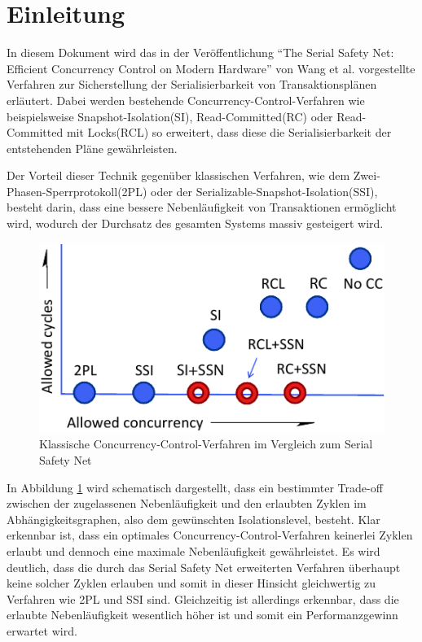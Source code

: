 \section{Einleitung}

In diesem Dokument wird das in der Veröffentlichung \enquote{The Serial Safety Net: Efficient Concurrency Control on Modern Hardware} von Wang et al. \cite{Wang:2015} vorgestellte Verfahren zur Sicherstellung der Serialisierbarkeit von Transaktionsplänen erläutert.
Dabei werden bestehende Concurrency-Control-Verfahren wie beispielsweise Snapshot-Isolation(SI), Read-Committed(RC) oder Read-Committed mit Locks(RCL) so erweitert, dass diese die Serialisierbarkeit der entstehenden Pläne gewährleisten.

Der Vorteil dieser Technik gegenüber klassischen Verfahren, wie dem Zwei-Phasen-Sperrprotokoll(2PL) oder der Serializable-Snapshot-Isolation(SSI), besteht darin, dass eine bessere Nebenläufigkeit von Transaktionen ermöglicht wird, wodurch der Durchsatz des gesamten Systems massiv gesteigert wird.

\begin{figure}
	\includegraphics{img/Figure_1_komplett.pdf}
	\caption{Klassische Concurrency-Control-Verfahren im Vergleich zum Serial Safety Net}
	\label{fig:trade_off}
\end{figure}

In Abbildung \ref{fig:trade_off} wird schematisch dargestellt, dass ein bestimmter Trade-off zwischen der zugelassenen Nebenläufigkeit und den erlaubten Zyklen im Abhängigkeitsgraphen, also dem gewünschten Isolationslevel, besteht.
Klar erkennbar ist, dass ein optimales Concurrency-Control-Verfahren keinerlei Zyklen erlaubt und dennoch eine maximale Nebenläufigkeit gewährleistet.
Es wird deutlich, dass die durch das Serial Safety Net erweiterten Verfahren überhaupt keine solcher Zyklen erlauben und somit in dieser Hinsicht gleichwertig zu Verfahren wie 2PL und SSI sind.
Gleichzeitig ist allerdings erkennbar, dass die erlaubte Nebenläufigkeit wesentlich höher ist und somit ein Performanzgewinn erwartet wird.

